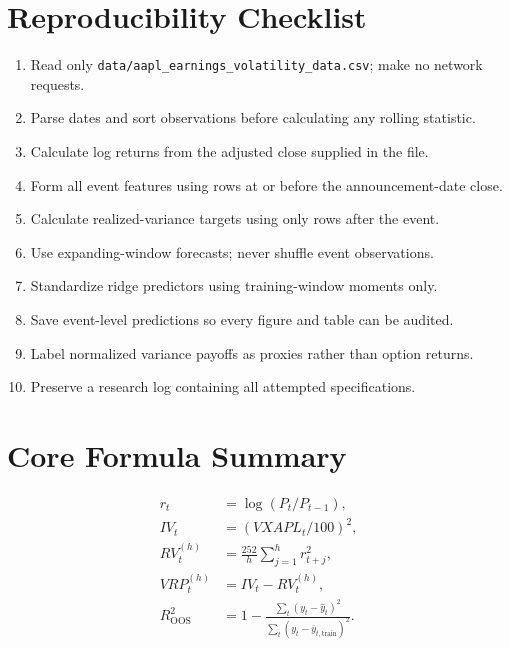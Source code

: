 \documentclass[11pt]{article}
\begin{document}
\appendix

\section{Reproducibility Checklist}

\begin{enumerate}[leftmargin=1.5em]
    \item Read only \texttt{data/aapl\_earnings\_volatility\_data.csv}; make no network requests.
    \item Parse dates and sort observations before calculating any rolling statistic.
    \item Calculate log returns from the adjusted close supplied in the file.
    \item Form all event features using rows at or before the announcement-date close.
    \item Calculate realized-variance targets using only rows after the event.
    \item Use expanding-window forecasts; never shuffle event observations.
    \item Standardize ridge predictors using training-window moments only.
    \item Save event-level predictions so every figure and table can be audited.
    \item Label normalized variance payoffs as proxies rather than option returns.
    \item Preserve a research log containing all attempted specifications.
\end{enumerate}

\section{Core Formula Summary}

\begin{align}
r_t &= \log(P_t/P_{t-1}),\\
IV_t &= (VXAPL_t/100)^2,\\
RV^{(h)}_t &= \frac{252}{h}\sum_{j=1}^{h}r_{t+j}^2,\\
VRP^{(h)}_t &= IV_t-RV^{(h)}_t,\\
R^2_{\mathrm{OOS}}&=1-\frac{\sum_t(y_t-\widehat y_t)^2}
{\sum_t(y_t-\bar y_{t,\mathrm{train}})^2}.
\end{align}
\end{document}
